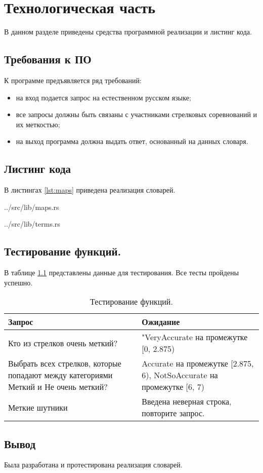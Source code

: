 \chapter{Технологическая часть}

В данном разделе приведены средства программной реализации и листинг кода.

\section{Требования к ПО}

К программе предъявляется ряд требований:
\begin{itemize}
    \item на вход подается запрос на естественном русском языке;
    \item все запросы должны быть связаны с участниками стрелковых соревнований и их меткостью;
    \item на выход программа должна выдать ответ, основанный на данных словаря.
\end{itemize}

\section{Листинг кода}

В листингах \ref{lst:maps} приведена реализация словарей.

\begin{lstinputlisting}[
	caption={Реализация словарей.},
	label={lst:maps},
	style={rust}
]{../src/lib/maps.rs}
\end{lstinputlisting}

\begin{lstinputlisting}[
	caption={Реализация термов.},
	label={lst:terms},
	style={rust}
]{../src/lib/terms.rs}
\end{lstinputlisting}


\section{Тестирование функций.}

В таблице \ref{tab:tests} представлены данные для тестирования. Все тесты пройдены успешно.

\begin{table}[h!]
	\begin{center}
		\begin{tabular}{|p{8cm}  | p{8cm}  |}
            \hline
            Запрос & Ожидание \\
            \hline
            Кто из стрелков очень меткий? & "VeryAccurate на промежутке [0, 2.875) \\
            \hline
            Выбрать всех стрелков, которые попадают между категориями Меткий и Не очень меткий?  &  Accurate на промежутке [2.875, 6), NotSoAccurate на промежутке [6, 7)\\
            \hline
            Меткие шутники & Введена неверная строка, повторите запрос. \\
            \hline
		\end{tabular}
	\end{center}
	\caption{\label{tab:tests} Тестирование функций.}
\end{table}
\FloatBarrier
\section*{Вывод}

Была разработана и протестирована реализация словарей.
